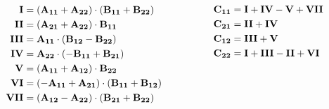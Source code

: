 \begin{frame}

\begin{columns}
  \begin{column}{0.5\textwidth}
\large
\begin{math}
\begin{aligned}
\text{\textbf{I}}   &= (\mathbf{A_{11}} + \mathbf{A_{22}}) \cdot (\mathbf{B_{11}} + \mathbf{B_{22}}) \\
\text{\textbf{II}}  &= (\mathbf{A_{21}} + \mathbf{A_{22}}) \cdot \mathbf{B_{11}} \\
\text{\textbf{III}} &= \mathbf{A_{11}} \cdot (\mathbf{B_{12}}-\mathbf{B_{22}}) \\
\text{\textbf{IV}}  &= \mathbf{A_{22}} \cdot (-\mathbf{B_{11}}+\mathbf{B_{21}}) \\
\text{\textbf{V}}   &= (\mathbf{A_{11}} + \mathbf{A_{12}}) \cdot \mathbf{B_{22}} \\
\text{\textbf{VI}}  &= (-\mathbf{A_{11}} + \mathbf{A_{21}}) \cdot (\mathbf{B_{11}} + \mathbf{B_{12}}) \\
\text{\textbf{VII}} &= (\mathbf{A_{12}} - \mathbf{A_{22}}) \cdot (\mathbf{B_{21}} + \mathbf{B_{22}}) \\
\end{aligned}
\end{math}

\end{column}

\begin{column}{0.5\textwidth}
  \large
  \begin{math}
  \begin{aligned}
  \mathbf{C_{11}} &= \text{\textbf{I}} + \text{\textbf{IV}} - \text{\textbf{V}} + \text{\textbf{VII}} \\
  \mathbf{C_{21}} &= \text{\textbf{II}} + \text{\textbf{IV}} \\
  \mathbf{C_{12}} &= \text{\textbf{III}} + \text{\textbf{V}}\\
  \mathbf{C_{22}} &= \text{\textbf{I}} + \text{\textbf{III}} - \text{\textbf{II}} + \text{\textbf{VI}} \\
  \end{aligned}
  \end{math}

\end{column}
\end{columns}

\end{frame}

